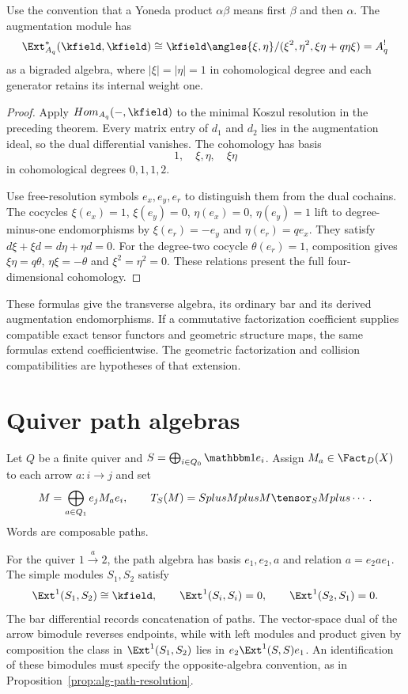 \begin{theorem}
Use the convention that a Yoneda product $\alpha\beta$ means first $\beta$ and then $\alpha$. The augmentation module has
\[
 \Ext^*_{A_q}(\kfield,\kfield)
 \cong
 \kfield\angles{\xi,\eta}/(\xi^2,\eta^2,\xi\eta+q\eta\xi)
 =A_q^!
\]
as a bigraded algebra, where $|\xi|=|\eta|=1$ in cohomological degree and each generator retains its internal weight one.
\end{theorem}
\begin{proof}
Apply $\Hom_{A_q}(-,\kfield)$ to the minimal Koszul resolution in the preceding theorem. Every matrix entry of $d_1$ and $d_2$ lies in the augmentation ideal, so the dual differential vanishes. The cohomology has basis
\[
 1,\quad \xi,\eta,\quad \xi\eta
\]
in cohomological degrees $0,1,1,2$.

Use free-resolution symbols $e_x,e_y,e_r$ to distinguish them from the dual cochains.
The cocycles $\xi(e_x)=1$, $\xi(e_y)=0$, $\eta(e_x)=0$, $\eta(e_y)=1$ lift to degree-minus-one endomorphisms by
$\xi(e_r)=-e_y$ and $\eta(e_r)=q e_x$.
They satisfy $d\xi+\xi d=d\eta+\eta d=0$.
For the degree-two cocycle $\theta(e_r)=1$, composition gives
$\xi\eta=q\theta$, $\eta\xi=-\theta$ and $\xi^2=\eta^2=0$.
These relations present the full four-dimensional cohomology.
\end{proof}

These formulas give the transverse algebra, its ordinary bar and its derived augmentation endomorphisms.
If a commutative factorization coefficient supplies compatible exact tensor functors and geometric structure maps, the same formulas extend coefficientwise.
The geometric factorization and collision compatibilities are hypotheses of that extension.

\chapter{Quiver path algebras}
Let $Q$ be a finite quiver and $S=\bigoplus_{i\in Q_0}\mathbbm1e_i$. Assign $M_a\in\Fact_D(X)$ to each arrow $a:i\to j$ and set
\[
 M=\bigoplus_{a\in Q_1}e_jM_ae_i,
 \qquad
 T_S(M)=S\oplus M\oplus M\tensor_S M\oplus\cdots.
\]
Words are composable paths.

For the quiver $1\xrightarrow{a}2$, the path algebra has basis $e_1,e_2,a$ and relation $a=e_2ae_1$. The simple modules $S_1,S_2$ satisfy
\[
 \Ext^1(S_1,S_2)\cong\kfield,
 \qquad
 \Ext^1(S_i,S_i)=0,
 \qquad
 \Ext^1(S_2,S_1)=0.
\]
The bar differential records concatenation of paths.
The vector-space dual of the arrow bimodule reverses endpoints, while with left modules and product given by composition the class in $\Ext^1(S_1,S_2)$ lies in $e_2\Ext^1(S,S)e_1$.
An identification of these bimodules must specify the opposite-algebra convention, as in Proposition~\ref{prop:alg-path-resolution}.

